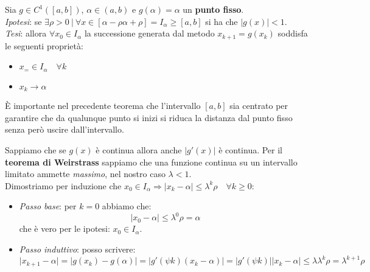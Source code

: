 \begin{theorem}
	Sia $g \in C^1([a,b])$, $\alpha \in (a,b)$ e $g(\alpha) = \alpha$ un \textbf{punto fisso}.\\
	\textit{Ipotesi}: se $\exists \rho >0 \:\vert\: \forall x \in [\alpha - \rho \alpha + \rho]=I_\alpha \geq [a,b]$ si ha che $\lvert g(x) \rvert < 1$.\\
	\textit{Tesi}: allora $\forall x_0 \in I_\alpha$ la successione generata dal metodo $x_{k+1} = g(x_k)$ soddisfa le seguenti proprietà:
	\begin{itemize}
		\item $x_= \in I_\alpha \quad \forall k$
		\item $x_k \to \alpha$
	\end{itemize}
\end{theorem}

\begin{observation}
	È importante nel precedente teorema che l'intervallo $[a,b]$ sia centrato per garantire che da qualunque punto si inizi si riduca la distanza dal punto fisso senza però uscire dall'intervallo.
\end{observation}

\begin{demostration}
	Sappiamo che se $g(x)$ è continua allora anche $\lvert g'(x) \rvert$ è continua. Per il \textbf{teorema di Weirstrass} sappiamo che una funzione continua su un intervallo limitato ammette \textit{massimo}, nel nostro caso $\lambda < 1$. \\
	Dimostriamo per induzione che $x_0 \in I_\alpha \Rightarrow \lvert x_k -\alpha \rvert \leq \lambda^k \rho \quad \forall k \geq 0$:
	\begin{itemize}
		\item \textit{Passo base}: per $k=0$ abbiamo che: 
		\begin{equation*}
			\lvert x_0 - \alpha \rvert \leq \lambda^0 \rho = \alpha
		\end{equation*}
		che è vero per le ipotesi: $x_0 \in I_\alpha$.
		\item \textit{Passo induttivo}: posso scrivere:
		\begin{equation*}
			\lvert x_{k+1} - \alpha \rvert = \lvert g(x_k) - g(\alpha) \rvert = \lvert g'(\psi k)(x_k - \alpha) \rvert = \lvert g'(\psi k) \rvert  \lvert x_k - \alpha \rvert \leq \lambda \lambda^k \rho = \lambda ^ {k+1} \rho
		\end{equation*}
	\end{itemize}
\end{demostration}

